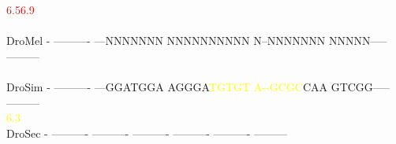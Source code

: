 \documentclass[11pt,twoside,reqno,a4paper]{article}
\begin{document}
{\hspace*{7\charwidth}\hspace*{1\charwidth}\hspace*{6\charwidth}\textcolor{Brown}{6.5}\hspace*{1\charwidth}\hspace*{1\charwidth}\hspace*{19\charwidth}\textcolor{Red}{6.9}\hspace*{1\charwidth}\hspace*{1\charwidth}\hspace*{1\charwidth}\\
\\
DroMel	-	----------	---NNNNNNN	NNNNNNNNNN	N--NNNNNNN	NNNNN-----	---------\\
\hspace*{7\charwidth}\hspace*{1\charwidth}\hspace*{1\charwidth}\hspace*{1\charwidth}\hspace*{1\charwidth}\hspace*{1\charwidth}\hspace*{1\charwidth}\\
DroSim	-	----------	---GGATGGA	AGGGA\textcolor{Yellow}{T}\textcolor{Yellow}{G}\textcolor{Yellow}{T}\textcolor{Yellow}{G}\textcolor{Yellow}{T}	\textcolor{Yellow}{A}\textcolor{Yellow}{-}\textcolor{Yellow}{-}\textcolor{Yellow}{G}\textcolor{Yellow}{C}\textcolor{Yellow}{G}\textcolor{Yellow}{C}CAA	GTCGG-----	---------\\
\hspace*{7\charwidth}\hspace*{1\charwidth}\hspace*{1\charwidth}\hspace*{1\charwidth}\hspace*{26\charwidth}\textcolor{Yellow}{6.3}\hspace*{1\charwidth}\hspace*{1\charwidth}\hspace*{1\charwidth}\\
DroSec	-	----------	----------	----------	----------	----------	---------\\
\hspace*{7\charwidth}\hspace*{1\charwidth}\hspace*{1\charwidth}\hspace*{1\charwidth}\hspace*{1\charwidth}\hspace*{1\charwidth}\hspace*{1\charwidth}\\
}
\end{document}
